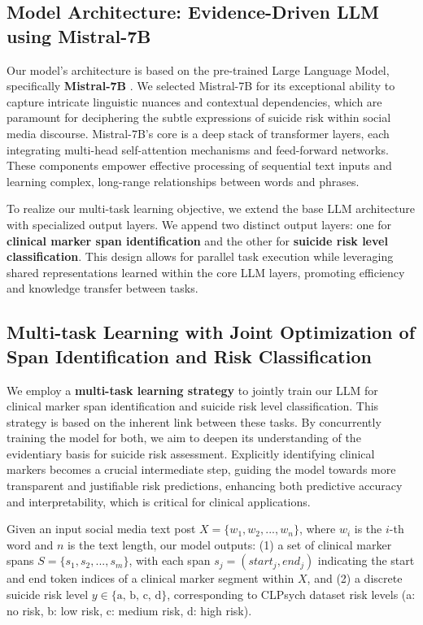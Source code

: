 \subsection{Model Architecture: Evidence-Driven LLM using Mistral-7B}

Our model's architecture is based on the pre-trained Large Language Model, specifically \textbf{Mistral-7B} \cite{Mistral7B}. We selected Mistral-7B for its exceptional ability to capture intricate linguistic nuances and contextual dependencies, which are paramount for deciphering the subtle expressions of suicide risk within social media discourse.  Mistral-7B's core is a deep stack of transformer layers, each integrating multi-head self-attention mechanisms and feed-forward networks. These components empower effective processing of sequential text inputs and learning complex, long-range relationships between words and phrases.

To realize our multi-task learning objective, we extend the base LLM architecture with specialized output layers.  We append two distinct output layers: one for \textbf{clinical marker span identification} and the other for \textbf{suicide risk level classification}. This design allows for parallel task execution while leveraging shared representations learned within the core LLM layers, promoting efficiency and knowledge transfer between tasks.

\subsection{Multi-task Learning with Joint Optimization of Span Identification and Risk Classification}

We employ a \textbf{multi-task learning strategy} to jointly train our LLM for clinical marker span identification and suicide risk level classification. This strategy is based on the inherent link between these tasks. By concurrently training the model for both, we aim to deepen its understanding of the evidentiary basis for suicide risk assessment.  Explicitly identifying clinical markers becomes a crucial intermediate step, guiding the model towards more transparent and justifiable risk predictions, enhancing both predictive accuracy and interpretability, which is critical for clinical applications.

Given an input social media text post $X = \{w_1, w_2, ..., w_n\}$, where $w_i$ is the $i$-th word and $n$ is the text length, our model outputs: (1) a set of clinical marker spans $S = \{s_1, s_2, ..., s_m\}$, with each span $s_j = (start_j, end_j)$ indicating the start and end token indices of a clinical marker segment within $X$, and (2) a discrete suicide risk level $y \in \{\text{a, b, c, d}\}$, corresponding to CLPsych dataset risk levels (a: no risk, b: low risk, c: medium risk, d: high risk).

